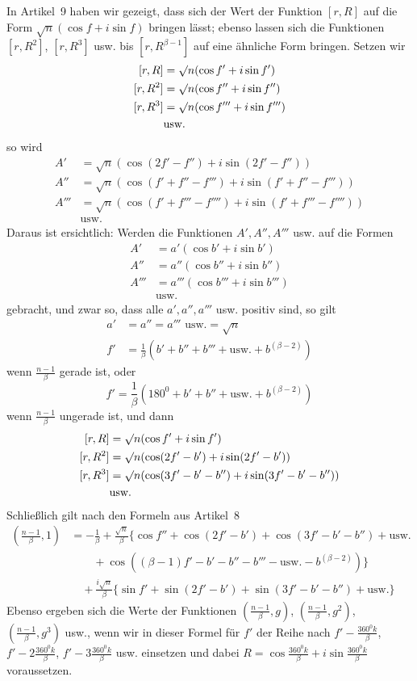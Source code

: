 In Artikel~9 haben wir gezeigt, dass sich der Wert der Funktion $[r,R]$ auf die Form $\surd n(\cos f+i\sin f)$ bringen lässt; ebenso lassen sich die Funktionen $[r,R^2]$, $[r,R^3]$ usw. bis $[r,R^{\beta-1}]$ auf eine ähnliche Form bringen. Setzen wir
\[
\begin{aligned}
\relax[r,R]&=\surd n(\cos f'+i\sin f')\\
\relax[r,R^2]&=\surd n(\cos f''+i\sin f'')\\
\relax[r,R^3]&=\surd n(\cos f'''+i\sin f''')\\
&\text{usw.}
\end{aligned}
\]
so wird
\[
\begin{aligned}
A'&=\surd n(\cos(2f'-f'')+i\sin(2f'-f''))\\
A''&=\surd n(\cos(f'+f''-f''')+i\sin(f'+f''-f'''))\\
A'''&=\surd n(\cos(f'+f'''-f'''')+i\sin(f'+f'''-f''''))\\
&\text{usw.}
\end{aligned}
\]
Daraus ist ersichtlich: Werden die Funktionen $A',A'',A'''$ usw. auf die Formen
\[
\begin{aligned}
A'&=a'(\cos b'+i\sin b')\\
A''&=a''(\cos b''+i\sin b'')\\
A'''&=a'''(\cos b'''+i\sin b''')\\
&\text{usw.}
\end{aligned}
\]
gebracht, und zwar so, dass alle $a',a'',a'''$ usw. positiv sind, so gilt
\[
\begin{aligned}
a'&=a''=a'''\text{ usw.}=\surd n\\
f'&=\frac1\beta(b'+b''+b'''+\text{usw.}+b^{(\beta-2)})
\end{aligned}
\]
wenn $\frac{n-1}\beta$ gerade ist, oder
\[
f'=\frac1\beta(180^0+b'+b''+\text{usw.}+b^{(\beta-2)})
\]
wenn $\frac{n-1}\beta$ ungerade ist, und dann
\[
\begin{aligned}
\relax[r,R]&=\surd n(\cos f'+i\sin f')\\
\relax[r,R^2]&=\surd n(\cos(2f'-b')+i\sin(2f'-b'))\\
\relax[r,R^3]&=\surd n(\cos(3f'-b'-b'')+i\sin(3f'-b'-b''))\\
&\text{usw.}
\end{aligned}
\]
Schließlich gilt nach den Formeln aus Artikel~8
\[
\begin{aligned}
\left(\frac{n-1}\beta,1\right)&=-\frac1\beta+\frac{\surd n}\beta\{\cos f''+\cos(2f'-b')+\cos(3f'-b'-b'')+\text{usw.}\\
&\qquad+\cos((\beta-1)f'-b'-b''-b'''-\text{usw.}-b^{(\beta-2)})\}\\
&\quad+\frac{i\surd n}\beta\{\sin f'+\sin(2f'-b')+\sin(3f'-b'-b'')+\text{usw.}\}
\end{aligned}
\]
Ebenso ergeben sich die Werte der Funktionen $\left(\frac{n-1}\beta,g\right)$, $\left(\frac{n-1}\beta,g^2\right)$, $\left(\frac{n-1}\beta,g^3\right)$ usw., wenn wir in dieser Formel für $f'$ der Reihe nach $f'-\frac{360^0k}\beta$, $f'-2\frac{360^0k}\beta$, $f'-3\frac{360^0k}\beta$ usw. einsetzen und dabei $R=\cos\frac{360^0k}\beta+i\sin\frac{360^0k}\beta$ voraussetzen.

